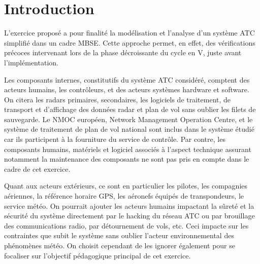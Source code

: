 
\pagebreak

\section*{Introduction}

L'exercice proposé a pour finalité la modélisation et l'analyse d'un système ATC simplifié dans un cadre MBSE. Cette approche permet, en effet, des vérifications précoces intervenant lors de la phase décroissante du cycle en V, juste avant l'implémentation.  

Les composants internes, constitutifs du système ATC considéré, comptent des acteurs humains, les contrôleurs, et des acteurs systèmes hardware et software. On citera les radars primaires, secondaires, les logiciels de traitement, de transport et d'affichage des données radar et plan de vol sans oublier les filets de sauvegarde. Le NMOC européen, Network Management Operation Centre, et le système de traitement de plan de vol national sont inclus dans le système étudié car ils participent à la fourniture du service de contrôle. Par contre, les composants humains, matériels et logiciel associés à l'aspect technique assurant notamment la maintenance des composants ne sont pas pris en compte dans le cadre de cet exercice.

Quant aux acteurs extérieurs, ce sont en particulier les pilotes, les compagnies aériennes, la référence horaire GPS, les aéronefs équipés de transpondeurs, le service météo. On pourrait ajouter les acteurs humains impactant la sûreté et la sécurité du système directement par le hacking du réseau ATC ou par brouillage des communications radio, par détournement de vols, etc. Ceci impacte sur les contraintes que subit le système sans oublier l'acteur environnemental des phénomènes météo. On choisit cependant de les ignorer également pour se focaliser sur l'objectif pédagogique principal de cet exercice. 







